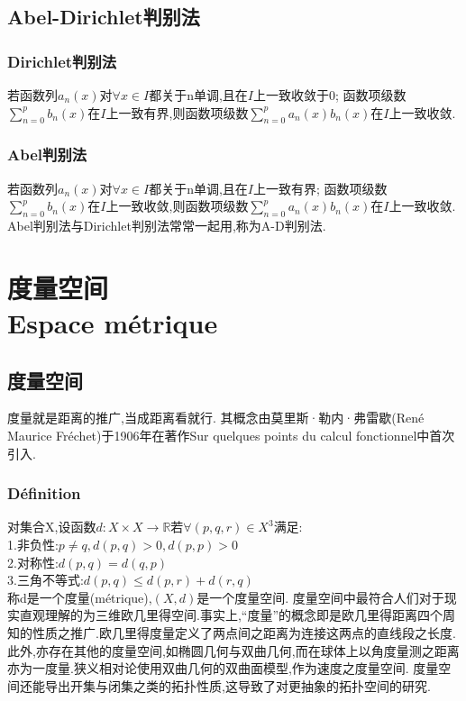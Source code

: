 \documentclass[12pt, a4paper, oneside]{ctexbook}
\newcommand{\R }{\mathbb{R}}%
\begin{document}
\section{Abel-Dirichlet判别法}
  \subsection{Dirichlet判别法}
  若函数列$a_n(x)$对$\forall x \in I$都关于n单调,且在$I$上一致收敛于0;
  函数项级数$\sum_{n=0}^{p}b_n(x)$在$I$上一致有界,则函数项级数$\sum_{n=0}^{p}a_n(x)b_n(x)$在$I$上一致收敛.
  \subsection{Abel判别法}
  若函数列$a_n(x)$对$\forall x \in I$都关于n单调,且在$I$上一致有界;
  函数项级数$\sum_{n=0}^{p}b_n(x)$在$I$上一致收敛,则函数项级数$\sum_{n=0}^{p}a_n(x)b_n(x)$在$I$上一致收敛.\\
  
  Abel判别法与Dirichlet判别法常常一起用,称为A-D判别法.
  

\chapter{度量空间\\Espace métrique}
\section{度量空间}
  度量就是距离的推广,当成距离看就行.
  其概念由莫里斯·勒内·弗雷歇(René Maurice Fréchet)于1906年在著作Sur quelques points du calcul fonctionnel中首次引入.
  \subsection{Définition}
  对集合X,设函数$d:X\times X\rightarrow \R$若$\forall(p,q,r)\in X^3$满足:\\
  1.非负性:$p\neq q,d(p,q)>0,d(p,p)>0$\\
  2.对称性:$d(p,q)=d(q,p)$\\
  3.三角不等式:$d(p,q)\leq d(p,r)+d(r,q)$\\
  称d是一个度量(métrique),$(X,d)$是一个度量空间.
  度量空间中最符合人们对于现实直观理解的为三维欧几里得空间.事实上,“度量”的概念即是欧几里得距离四个周知的性质之推广.欧几里得度量定义了两点间之距离为连接这两点的直线段之长度.
  此外,亦存在其他的度量空间,如椭圆几何与双曲几何,而在球体上以角度量测之距离亦为一度量.狭义相对论使用双曲几何的双曲面模型,作为速度之度量空间.
  度量空间还能导出开集与闭集之类的拓扑性质,这导致了对更抽象的拓扑空间的研究.
                 
\end{document}
